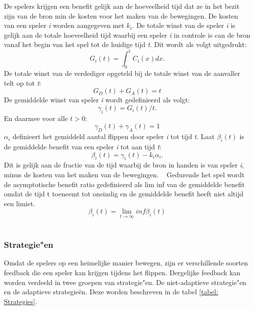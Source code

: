 \documentclass[master=cws, masteroption=vs]{kulemt}
\begin{document}
\begin{abstract*}
De spelers krijgen een benefit gelijk aan de hoeveelheid tijd dat ze in het bezit zijn van de bron min de kosten voor het maken van de bewegingen. De kosten van een speler \textit{i} worden aangegeven met $ k_{i} $.
De totale winst van de speler \textit{i} is gelijk aan de totale hoeveelheid tijd waarbij een speler \textit{i} in controle is can de bron vanaf het begin van het spel tot de huidige tijd \textit{t}. Dit wordt als volgt uitgedrukt:
\begin{equation}
G_{i}(t) = \int_0^t \! C_{i}(x) dx.
\end{equation}
De totale winst van de verdediger opgeteld bij de totale winst van de aanvaller telt op tot \textit{t}:
\begin{equation} 
G_{D}(t) + G_{A}(t) = t
\end{equation}
De gemiddelde winst van speler \textit{i} wordt gedefinieerd als volgt:
\begin{equation}
\gamma_{i}(t) = G_{i}(t) / t.
\end{equation}
En daarmee voor alle $ t> 0 $:
\begin{equation} 
\gamma_{D}(t) + \gamma_{A}(t) = 1
\end{equation}
$ \alpha_{i} $ definieert het gemiddeld aantal flippen door speler \textit{i} tot tijd \textit{t}.
Laat $ \beta_{i}(t) $ is de gemiddelde benefit van een speler \textit{i} tot aan tijd \textit{t}:
\begin{equation}
\beta_{i}(t) = \gamma_{i}(t) - k_{i} \alpha_{i}.
\end{equation}
Dit is gelijk aan de fractie van de tijd waarbij de bron in handen is van speler \textit{i}, minus de kosten van het maken van de bewegingen. ~ 
Gedurende het spel wordt de asymptotische benefit ratio gedefinieerd als lim inf van de gemiddelde benefit omdat de tijd t toeneemt tot oneindig en de gemiddelde benefit heeft niet altijd een limiet.
\begin{equation}
\beta_{i} (t) = \lim_{t \to \infty } inf \beta_{i}(t)
\end{equation}
\\


\subsubsection{Strategie"en}
Omdat de spelers op een heimelijke manier bewegen, zijn er verschillende soorten feedback die een speler kan krijgen tijdens het flippen. Dergelijke feedback kan worden verdeeld in twee groepen van strategie"en. De niet-adaptieve strategie"en en de adaptieve strategie\"en. Deze worden beschreven in de tabel \ref{tabel: Strategies}. \\


\end{abstract*}
\end{document}
